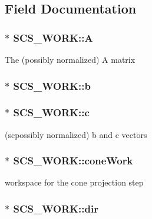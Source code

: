 \subsection{Field Documentation}
\hypertarget{struct_s_c_s___w_o_r_k_afe6650f1ce2c18865f73314ed5b49261}{
\subsubsection[{A}]{$\ast$ S\-C\-S\-\_\-\-W\-O\-R\-K\-::\-A}}\label{struct_s_c_s___w_o_r_k_afe6650f1ce2c18865f73314ed5b49261}
The (possibly normalized) A matrix \hypertarget{struct_s_c_s___w_o_r_k_af34066f7314e529b105b1a88776eb2c7}{
\subsubsection[{b}]{$\ast$ S\-C\-S\-\_\-\-W\-O\-R\-K\-::b}}\label{struct_s_c_s___w_o_r_k_af34066f7314e529b105b1a88776eb2c7}
\hypertarget{struct_s_c_s___w_o_r_k_a5d546a065cf3b3a228617147184287a9}{
\subsubsection[{c}]{ $\ast$ S\-C\-S\-\_\-\-W\-O\-R\-K\-::c}}\label{struct_s_c_s___w_o_r_k_a5d546a065cf3b3a228617147184287a9}
(scpossibly normalized) b and c vectors \hypertarget{struct_s_c_s___w_o_r_k_a6286cc9b1462d1f0adf9046b03ca6277}{
\subsubsection[{cone\-Work}]{$\ast$ S\-C\-S\-\_\-\-W\-O\-R\-K\-::cone\-Work}}\label{struct_s_c_s___w_o_r_k_a6286cc9b1462d1f0adf9046b03ca6277}
workspace for the cone projection step \hypertarget{struct_s_c_s___w_o_r_k_a2f5ec63f05a0d782eed2435d24e018b0}{
\subsubsection[{dir}]{$\ast$ S\-C\-S\-\_\-\-W\-O\-R\-K\-::dir}}\label{struct_s_c_s___w_o_r_k_a2f5ec63f05a0d782eed2435d24e018b0}
